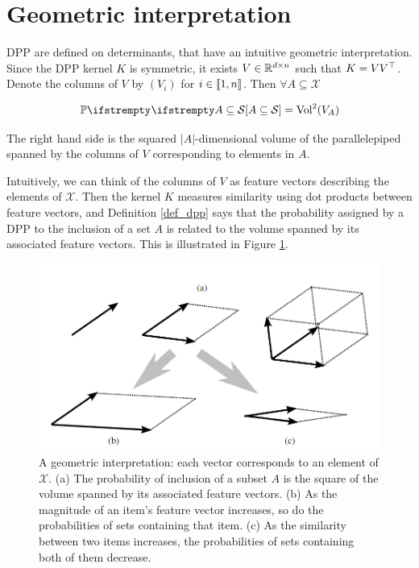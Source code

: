 \section{Geometric interpretation}
DPP are defined on determinants, that have an intuitive geometric interpretation. Since the DPP kernel $K$ is symmetric, it exists $V \in \mathbb{R}^{d \times n}$ such that $K= V V^\top$. 
Denote the columns of $V$ by $(V_i)$ for $i\in \llbracket 1,n \rrbracket$. Then $\forall A \subseteq \mathcal{X}$

\begin{equation}
    \PP{}{A \subseteq \mathcal{S}} = \operatorname{Vol}^2(V_A)
\end{equation}

The right hand side is the squared $|A|$-dimensional volume of the parallelepiped
spanned by the columns of $V$ corresponding to elements in $A$.

Intuitively, we can think of the columns of $V$ as feature vectors describing the elements
of $\mathcal{X}$. Then the kernel $K$ measures similarity using dot products between feature vectors, and Definition \ref{def_dpp} says that the probability assigned by a DPP to the inclusion of a set $A$ is related to the volume spanned by its associated feature vectors. This is illustrated in Figure \ref{fig_geometric_interpret}.

\begin{figure}[!ht]
    \centering
    \includegraphics[width=0.8\linewidth]{pics/geometric_interpret.png}
    \caption{A geometric interpretation: each vector corresponds to an element of $\mathcal{X}$. (a) The  probability of inclusion of a subset $A$ is the square of the volume spanned by its associated feature vectors. (b) As the magnitude of an item's feature vector increases, so do the probabilities of sets containing that item. (c) As the similarity between two items increases, the probabilities of sets containing both of them decrease.}
    \label{fig_geometric_interpret}
\end{figure}

